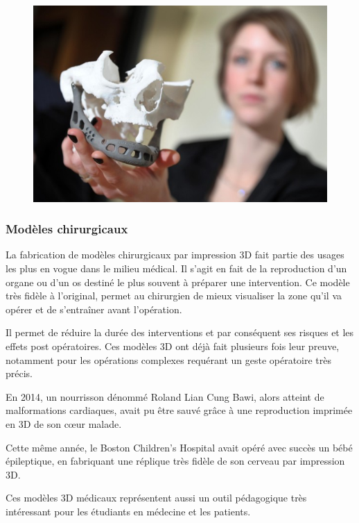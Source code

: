 \documentclass{article}
\begin{document}
\begin{figure}[h!]
\centering
\includegraphics[scale=0.4]{./images/Machoire.png}
\end{figure}
\newpage
\subsubsection{Modèles chirurgicaux}
La fabrication de modèles chirurgicaux par impression 3D fait partie des usages les plus en vogue dans le milieu médical. Il s'agit en fait de la reproduction d'un organe ou d'un os destiné le plus souvent à préparer une intervention. Ce modèle très fidèle à l'original, permet au chirurgien de mieux visualiser la zone qu'il va opérer et de s'entraîner avant l'opération.\hfill
 \par\leavevmode\par
Il permet de réduire la durée des interventions et par conséquent ses risques et les effets post opératoires. Ces modèles 3D ont déjà fait plusieurs fois leur preuve, notamment pour les opérations complexes requérant un geste opératoire très précis.\hfill
 \par\leavevmode\par
En 2014, un nourrisson dénommé Roland Lian Cung Bawi, alors atteint de malformations cardiaques, avait pu être sauvé grâce à une reproduction imprimée en 3D de son cœur malade.\hfill
 \par\leavevmode\par
Cette même année, le Boston Children's Hospital avait opéré avec succès un bébé épileptique, en fabriquant une réplique très fidèle de son cerveau par impression 3D.\hfill
 \par\leavevmode\par
Ces modèles 3D médicaux représentent aussi un outil pédagogique très \hfill \break intéressant pour les étudiants en médecine et les patients.
\end{document}
